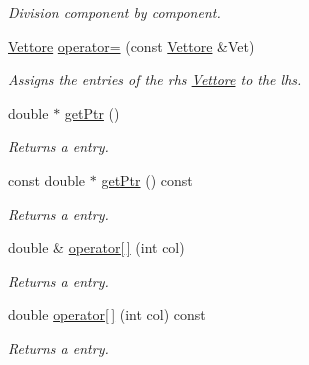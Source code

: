 \begin{DoxyCompactItemize}
\begin{DoxyCompactList}\small\item\em Division component by component. \end{DoxyCompactList}\item 
\hyperlink{classVettore}{Vettore} \hyperlink{classVettore_ae984a878df7082f220fe8512856f843d}{operator=} (const \hyperlink{classVettore}{Vettore} \&Vet)\hypertarget{classVettore_ae984a878df7082f220fe8512856f843d}{}\label{classVettore_ae984a878df7082f220fe8512856f843d}

\begin{DoxyCompactList}\small\item\em Assigns the entries of the rhs \hyperlink{classVettore}{Vettore} to the lhs. \end{DoxyCompactList}\item 
double $\ast$ \hyperlink{classVettore_acde0dec95305cc462f912016373a77fe}{get\+Ptr} ()\hypertarget{classVettore_acde0dec95305cc462f912016373a77fe}{}\label{classVettore_acde0dec95305cc462f912016373a77fe}

\begin{DoxyCompactList}\small\item\em Returns a entry. \end{DoxyCompactList}\item 
const double $\ast$ \hyperlink{classVettore_ac9628a8286213402e12603779d7fe5ae}{get\+Ptr} () const \hypertarget{classVettore_ac9628a8286213402e12603779d7fe5ae}{}\label{classVettore_ac9628a8286213402e12603779d7fe5ae}

\begin{DoxyCompactList}\small\item\em Returns a entry. \end{DoxyCompactList}\item 
double \& \hyperlink{classVettore_a1928a371eb2c20841b3916ba9824b8a4}{operator\mbox{[}$\,$\mbox{]}} (int col)\hypertarget{classVettore_a1928a371eb2c20841b3916ba9824b8a4}{}\label{classVettore_a1928a371eb2c20841b3916ba9824b8a4}

\begin{DoxyCompactList}\small\item\em Returns a entry. \end{DoxyCompactList}\item 
double \hyperlink{classVettore_af57ef48295a3c4e8f3379287f2a7e687}{operator\mbox{[}$\,$\mbox{]}} (int col) const \hypertarget{classVettore_af57ef48295a3c4e8f3379287f2a7e687}{}\label{classVettore_af57ef48295a3c4e8f3379287f2a7e687}

\begin{DoxyCompactList}\small\item\em Returns a entry. \end{DoxyCompactList}\end{DoxyCompactItemize}

